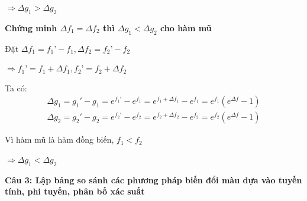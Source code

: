 $\Rightarrow \Delta g_1 > \Delta g_2$

\textbf{Chứng minh $\Delta f_1 = \Delta f_2$ thì $\Delta g_1 < \Delta g_2$ cho hàm mũ}

Đặt $\Delta f_1 = f_1’ - f_1, \Delta f_2 = f_2’ - f_2$

$\Rightarrow f_1’ = f_1 + \Delta f_1, f_2’ = f_2 + \Delta f_2$

Ta có:
\begin{gather*}
	\Delta g_1 = g_1' - g_1 = e^{f_1'} - e^{f_1} = e^{f_1 + \Delta f_1} - e^{f_1} = e^{f_1}(e^{\Delta f} - 1) \\
	\Delta g_2 = g_2' - g_2 = e^{f_2'} - e^{f_2} = e^{f_2 + \Delta f_2} - e^{f_2} = e^{f_2}(e^{\Delta f} - 1)
\end{gather*}

Vì hàm mũ là hàm đồng biến, $f_1 < f_2$

$\Rightarrow \Delta g_1 < \Delta g_2$

\textbf{Câu 3: Lập bảng so sánh các phương pháp biến đổi màu dựa vào tuyến tính, phi tuyến, phân bố xác suất}

